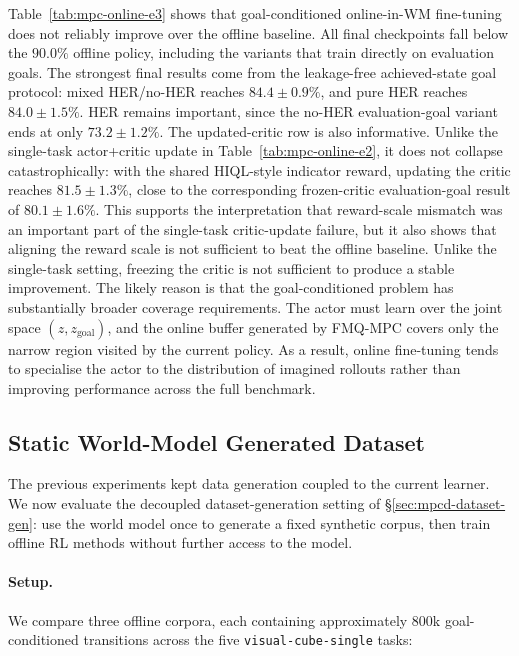 Table~\ref{tab:mpc-online-e3} shows that goal-conditioned
online-in-WM fine-tuning does not reliably improve over the offline
baseline. All final checkpoints fall below the $90.0\%$ offline policy,
including the variants that train directly on evaluation goals. The
strongest final results come from the leakage-free achieved-state
goal protocol: mixed HER/no-HER reaches $84.4 \pm 0.9\%$, and pure HER
reaches $84.0 \pm 1.5\%$. HER remains important, since the no-HER
evaluation-goal variant ends at only $73.2 \pm 1.2\%$.
The updated-critic row is also informative. Unlike the single-task
actor+critic update in Table~\ref{tab:mpc-online-e2}, it does not
collapse catastrophically: with the shared HIQL-style indicator reward,
updating the critic reaches $81.5 \pm 1.3\%$, close to the corresponding
frozen-critic evaluation-goal result of $80.1 \pm 1.6\%$. This supports
the interpretation that reward-scale mismatch was an important part of
the single-task critic-update failure, but it also shows that aligning
the reward scale is not sufficient to beat the offline baseline.
Unlike the single-task setting, freezing the critic is not sufficient to
produce a stable improvement. The likely reason is that the
goal-conditioned problem has substantially broader coverage
requirements. The actor must learn over the joint space
$(z,z_{\mathrm{goal}})$, and the online buffer generated by FMQ-MPC
covers only the narrow region visited by the current policy. As a
result, online fine-tuning tends to specialise the actor to the
distribution of imagined rollouts rather than improving performance
across the full benchmark.

\subsection{Static World-Model Generated Dataset}
\label{sec:exp-wm-dataset-gen}

The previous experiments kept data generation coupled to the current
learner. We now evaluate the decoupled dataset-generation setting of
\S\ref{sec:mpcd-dataset-gen}: use the world model once to generate a
fixed synthetic corpus, then train offline RL methods without further
access to the model.

\paragraph{Setup.}
We compare three offline corpora, each containing approximately
$800$k goal-conditioned transitions across the five
\texttt{visual-cube-single} tasks:

